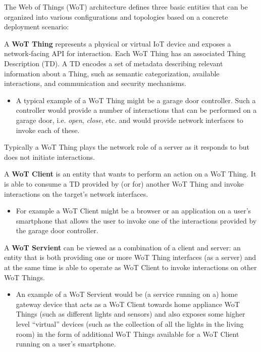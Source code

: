 The Web of Things (WoT) architecture\cite{Wot2017arch} defines three basic entities
that can be organized into various configurations and topologies 
based on a concrete deployment scenario:

A \textbf{WoT Thing} represents a physical or virtual IoT device 
        and exposes a network-facing API for interaction.
	Each WoT Thing has an associated Thing Description (TD)\cite{Wot2017td}. 
        A TD encodes a set of metadata describing relevant information about a Thing,
        such as semantic categorization, available interactions, and communication and security mechanisms.
        \begin{itemize}
	\item{A typical example of a WoT Thing might be a garage door controller.
        Such a controller would provide a number of interactions that can be performed on a garage door, 
        i.e. \textit{open}, \textit{close}, etc. and would provide network interfaces to invoke
        each of these.}
        \end{itemize}
        Typically a WoT Thing plays the network role of a server as it responds to
        but does not initiate interactions.


A \textbf{WoT Client} is an entity that wants to perform an action on a WoT Thing.
	It is able to consume a TD provided by (or for) another WoT Thing and invoke interactions on 
        the target's network interfaces.
        \begin{itemize}
	\item{For example a WoT Client might be a browser or an application on a user's smartphone
        that allows the user to invoke one of the interactions provided by the garage door controller. 
        }
        \end{itemize}


A \textbf{WoT Servient} can be viewed as a combination of a client and server:
        an entity that is both providing one or more WoT Thing interfaces (as a server) and
        at the same time is able to operate as WoT Client to invoke interactions on other WoT Things.
        \begin{itemize}
	\item{An example of a WoT Servient would be (a service running on a) home gateway device 
        that acts as a WoT Client towards home appliance WoT Things
        (such as different lights and sensors) and also exposes some higher level
        ``virtual'' devices (such as the collection of all the lights in the living room)
        in the form of additional WoT Things available for a WoT Client running on a user's smartphone.
        }
        \end{itemize}

